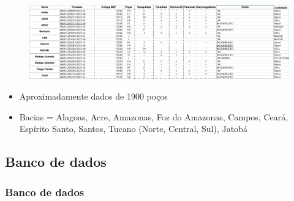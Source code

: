 \documentclass[aspectratio=169]{beamer} %
\begin{document}
{{\begin{frame}
	    \begin{figure}
		    \includegraphics[scale=0.2]{images/ANPdados.png}
	    \end{figure}
	\begin{itemize}
		\item Aproximadamente dados de 1900 poços
                \pause
		\item Bacias = Alagoas, Acre,  Amazonas, Foz do Amazonas, Campos, Ceará, Espírito Santo, Santos, Tucano (Norte, Central, Sul), Jatobá 
	\end{itemize}
\end{frame} 
}

\subsection{Banco de dados }

{
\begin{frame}
	\frametitle{Banco de dados}




\end{frame}}}
\end{document}
